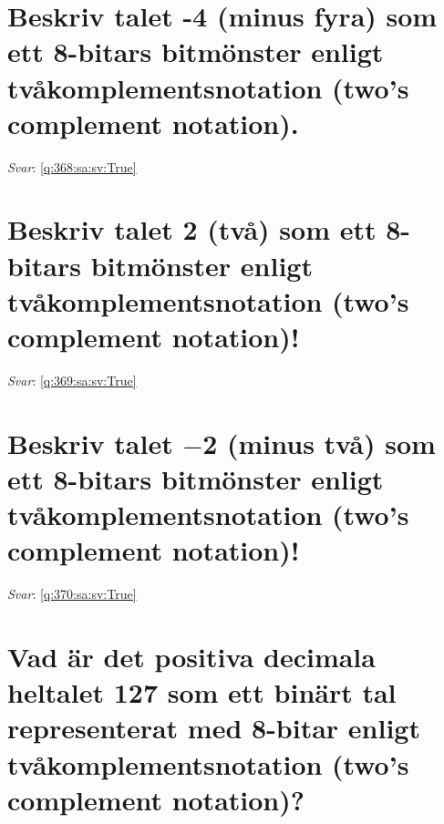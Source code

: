 \documentclass[a4paper,11pt,oneside]{book}
\begin{document}
\begin{sloppypar}
\section{Beskriv talet -4 (minus fyra) som ett 8-bitars bitm\"onster enligt tv\r{a}komplementsnotation (two{\textquoteright}s complement notation).}

\label{q:368:sa:sv:False}

\vspace{2cm}

\noindent\makebox[\textwidth]{\hrulefill}

\vspace{1cm}

\textit{Svar}: \autoref{q:368:sa:sv:True}



\section{Beskriv talet 2 (tv\r{a}) som ett 8-bitars bitm\"onster enligt tv\r{a}komplementsnotation (two{\textquoteright}s complement notation)!}

\label{q:369:sa:sv:False}

\vspace{2cm}

\noindent\makebox[\textwidth]{\hrulefill}

\vspace{1cm}

\textit{Svar}: \autoref{q:369:sa:sv:True}



\section{Beskriv talet \ensuremath{-}2 (minus tv\r{a}) som ett 8-bitars bitm\"onster enligt tv\r{a}komplementsnotation (two{\textquoteright}s complement notation)!}

\label{q:370:sa:sv:False}

\vspace{2cm}

\noindent\makebox[\textwidth]{\hrulefill}

\vspace{1cm}

\textit{Svar}: \autoref{q:370:sa:sv:True}



\section{Vad \"ar det positiva decimala heltalet 127 som ett bin\"art tal representerat med 8-bitar enligt tv\r{a}komplementsnotation (two{\textquoteright}s complement notation)?}


\end{sloppypar}
\end{document}
